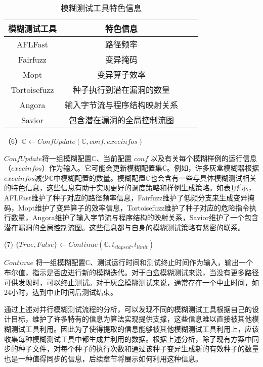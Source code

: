 \documentclass[master]{thesis-uestc}
\begin{document}
\begin{table}[!htbp]
    \caption{模糊测试工具特色信息}
    \begin{tabular}{cccc}
    \toprule
    模糊测试工具& 特色信息 \\
    \midrule
    AFLFast & 路径频率 \\
    Fairfuzz & 变异掩码 \\
    Mopt & 变异算子效率 \\
    Tortoisefuzz & 种子执行到潜在漏洞的数量 \\
    Angora & 输入字节流与程序结构映射关系 \\
    Savior & 包含潜在漏洞的全局控制流图 \\
    \bottomrule
    \end{tabular}
    \label{table_info}
    \vspace{6pt}
\end{table}

（6）$\mathbb{C} \leftarrow ConfUpdate(\mathbb{C}, conf, execinfos)$

$ConfUpdate$将一组模糊配置$\mathbb{C}$、当前配置 $conf$ 以及有关每个模糊样例的运行信息（$execinfos$）作为输入。它可能会更新模糊配置集$\mathbb{C}$。例如，许多灰盒模糊器根据$execinfos$减少$\mathbb{C}$中模糊配置的数量。模糊配置$\mathbb{C}$也会含有一些与具体模糊测试相关的特色信息，这些信息有助于实现更好的调度策略和样例生成策略。如表\ref{table_info}所示，AFLFast维护了种子对应的路径频率信息，Fairfuzz维护了低频分支来生成变异掩码，Mopt维护了变异算子的效率信息，Tortoisefuzz维护了种子对应的危险指令执行数量，Angora维护了输入字节流与程序结构的映射关系，Savior维护了一个包含潜在漏洞的全局控制流图。这些信息都与自身的模糊测试策略有紧密的联系。

(7) $\{True, False\}\leftarrow Continue(\mathbb{C}, t_{elapsed}, t_{limit})$ 

$Continue$ 将一组模糊配置$\mathbb{C}$、测试运行时间和测试终止时间作为输入，输出一个布尔值，指示是否应进行新的模糊迭代。对于白盒模糊测试来说，当没有更多路径可供发现时，可以终止测试。对于灰盒模糊测试来说，通常存在一个中止时间，如24小时，达到中止时间后测试结束。

通过上述对并行模糊测试流程的分析，可以发现不同的模糊测试工具根据自己的设计目标，维护了许多特有的信息为算法实现提供支撑，这些信息难以直接被其他模糊测试工具利用。因此为了使得提取的信息能够被其他模糊测试工具利用上，应该收集每种模糊测试工具中都生成并利用的数据。根据上述分析，除了现有方案中同步的种子文件，对每个种子的执行次数和通过该种子变异生成新的有效种子的数量也是一种值得同步的信息，后续章节将展示如何利用这种信息。
\end{document}

